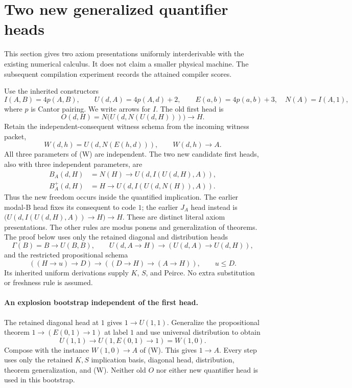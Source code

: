 \section{Two new generalized quantifier heads}
\label{sec:generalized-modal-heads}
This section gives two axiom presentations uniformly interderivable with the
existing numerical calculus. It does not claim a smaller physical machine.
The subsequent compilation experiment records the attained compiler scores.

Use the inherited constructors
\[
 I(A,B)=4p(A,B),\qquad U(d,A)=4p(A,d)+2,\qquad E(a,b)=4p(a,b)+3,
 \quad N(A)=I(A,1),
\]
where $p$ is Cantor pairing. We write arrows for $I$. The old first head is
\[
 O(d,H)=N\bigl(U(d,N(U(d,H)))\bigr)\to H.
\]
Retain the independent-consequent witness schema from the incoming witness
packet,
\[
 W(d,h)=U(d,N(E(h,d))),\qquad W(d,h)\to A.                 \tag{W}
\]
All three parameters of (W) are independent. The two new candidate first
heads, also with three independent parameters, are
\begin{align*}
 B_A(d,H)&=N(H)\to U(d,I(U(d,H),A)),\\
 B_A^+(d,H)&=H\to U(d,I(U(d,N(H)),A)).
\end{align*}
Thus the new freedom occurs inside the quantified implication. The earlier
modal-B head fixes its consequent to code $1$; the earlier $J_A$ head
instead is $\bigl(U(d,I(U(d,H),A))\to H\bigr)\to H$.
These are distinct literal axiom presentations. The other rules are
modus ponens and generalization of theorems. The proof below uses only the
retained diagonal and distribution heads
\[
 \Gamma(B)=B\to U(B,B),\qquad
 U(d,A\to H)\to(U(d,A)\to U(d,H)),
\]
and the restricted propositional schema
\[
 ((H\to u)\to D)\to((D\to H)\to(A\to H)),\qquad u\le D.
\]
Its inherited uniform derivations supply $K$, $S$, and Peirce. No extra
substitution or freshness rule is assumed.

\paragraph{An explosion bootstrap independent of the first head.}
The retained diagonal head at $1$ gives $1\to U(1,1)$.
Generalize the propositional theorem
$1\to(E(0,1)\to1)$ at label $1$ and use universal distribution to obtain
\[
 U(1,1)\to U(1,E(0,1)\to1)=W(1,0).
\]
Compose with the instance $W(1,0)\to A$ of (W). This gives $1\to A$.
Every step uses only the retained $K,S$ implication basis, diagonal head,
distribution, theorem generalization, and (W). Neither old $O$ nor either
new quantifier head is used in this bootstrap.


